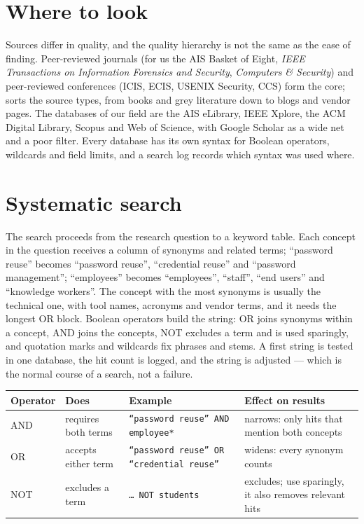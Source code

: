 \documentclass[11pt,a4paper,british,twoside=false,headings=small,chapterprefix=false,numbers=noenddot]{scrbook}
\begin{document}
\section{Where to look}

Sources differ in quality, and the quality hierarchy is not the same as the ease of finding. Peer-reviewed journals (for us the AIS Basket of Eight, \emph{IEEE Transactions on Information Forensics and Security}, \emph{Computers \& Security}) and peer-reviewed conferences (ICIS, ECIS, USENIX Security, CCS) form the core;  sorts the source types, from books and grey literature down to blogs and vendor pages. The databases of our field are the AIS eLibrary, IEEE Xplore, the ACM Digital Library, Scopus and Web of Science, with Google Scholar as a wide net and a poor filter. Every database has its own syntax for Boolean operators, wildcards and field limits, and a search log records which syntax was used where.

\section{Systematic search}

The search proceeds from the research question to a keyword table. Each concept in the question receives a column of synonyms and related terms; ``password reuse'' becomes ``password reuse'', ``credential reuse'' and ``password management''; ``employees'' becomes ``employees'', ``staff'', ``end users'' and ``knowledge workers''. The concept with the most synonyms is usually the technical one, with tool names, acronyms and vendor terms, and it needs the longest OR block. Boolean operators build the string: OR joins synonyms within a concept, AND joins the concepts, NOT excludes a term and is used sparingly, and quotation marks and wildcards fix phrases and stems. A first string is tested in one database, the hit count is logged, and the string is adjusted --- which is the normal course of a search, not a failure.

\begin{center}\small
  \renewcommand{\arraystretch}{1.2}
  \begin{tabular}{@{}p{1.6cm}p{2.4cm}p{5.2cm}p{3.6cm}@{}}
    \toprule
    \textbf{Operator} & \textbf{Does} & \textbf{Example} & \textbf{Effect on results}\\
    \midrule
    AND & requires both terms & \texttt{``password reuse'' AND employee*} & narrows: only hits that mention both concepts\\
    OR & accepts either term & \texttt{``password reuse'' OR ``credential reuse''} & widens: every synonym counts\\
    NOT & excludes a term & \texttt{\dots\ NOT students} & excludes; use sparingly, it also removes relevant hits\\
    \bottomrule
  \end{tabular}
\end{center}
\end{document}
